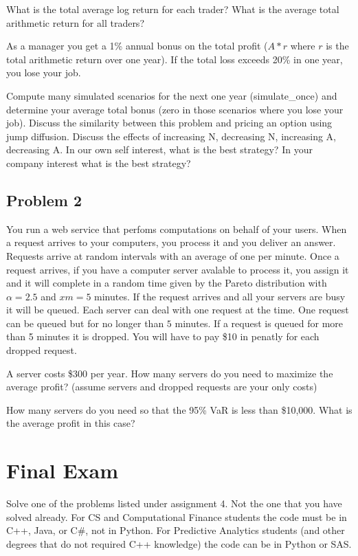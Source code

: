 \documentclass[12pt]{article}
\begin{document}
What is the total average log return for each trader? What is the average total arithmetic return for all traders?

As a manager you get a 1\% annual bonus on the total profit ($A*r$ where $r$ is the total arithmetic return over one year). If the total loss exceeds 20\% in one year, you lose your job.

Compute many simulated scenarios for the next one year (simulate\_once) and determine your average total bonus (zero in those scenarios where you lose your job). Discuss the similarity between this problem and pricing an option using jump diffusion. Discuss the effects of increasing N, decreasing N, increasing A, decreasing A. In our own self interest, what is the best strategy? In your company interest what is the best strategy?

\subsection{Problem 2}

You run a web service that perfoms computations on behalf of your users. When a request arrives to your computers, you process it and you deliver an answer. Requests arrive at random intervals with an average of one per minute. Once a request arrives, if you have a computer server avalable to process it, you assign it and it will complete in a random time given by the Pareto distribution with $\alpha=2.5$ and $xm=5$ minutes. If the request arrives and all your servers are busy it will be queued. Each server can deal with one request at the time. One request can be queued but for no longer than $5$ minutes. If a request is queued for more than 5 minutes it is dropped. You will have to pay \$10 in penatly for each dropped request.

A server costs \$300 per year. How many servers do you need to maximize the average profit? (assume servers and dropped requests are your only costs)

How many servers do you need so that the 95\% VaR is less than \$10,000.
What is the average profit in this case?

\section{Final Exam}

Solve one of the problems listed under assignment 4. Not the one that you have solved already. For CS and Computational Finance students the code must be in C++, Java, or C\#, not in Python. For Predictive Analytics students (and other degrees that do not required C++ knowledge) the code can be in Python or SAS.
\end{document}
